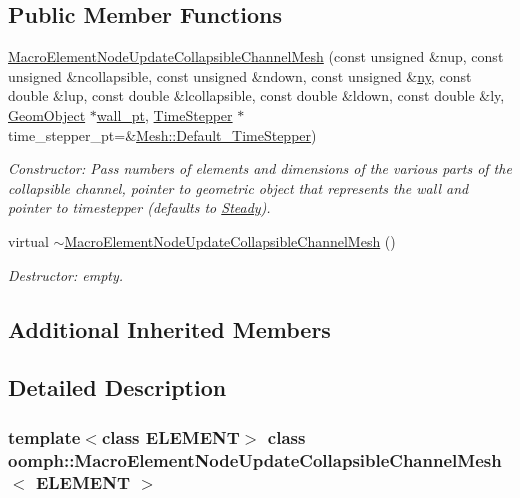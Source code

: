 \subsection*{Public Member Functions}
\begin{DoxyCompactItemize}
\item 
\hyperlink{classoomph_1_1MacroElementNodeUpdateCollapsibleChannelMesh_a5b7f150c4569c8d59d8220980a84cac5}{Macro\+Element\+Node\+Update\+Collapsible\+Channel\+Mesh} (const unsigned \&nup, const unsigned \&ncollapsible, const unsigned \&ndown, const unsigned \&\hyperlink{classoomph_1_1SimpleRectangularQuadMesh_a45011f22dedd480392b1f376e4269921}{ny}, const double \&lup, const double \&lcollapsible, const double \&ldown, const double \&ly, \hyperlink{classoomph_1_1GeomObject}{Geom\+Object} $\ast$\hyperlink{classoomph_1_1CollapsibleChannelMesh_a04ffeb61678763dfd250962ea9ba614b}{wall\+\_\+pt}, \hyperlink{classoomph_1_1TimeStepper}{Time\+Stepper} $\ast$time\+\_\+stepper\+\_\+pt=\&\hyperlink{classoomph_1_1Mesh_a12243d0fee2b1fcee729ee5a4777ea10}{Mesh\+::\+Default\+\_\+\+Time\+Stepper})
\begin{DoxyCompactList}\small\item\em Constructor\+: Pass numbers of elements and dimensions of the various parts of the collapsible channel, pointer to geometric object that represents the wall and pointer to timestepper (defaults to \hyperlink{classoomph_1_1Steady}{Steady}). \end{DoxyCompactList}\item 
virtual \hyperlink{classoomph_1_1MacroElementNodeUpdateCollapsibleChannelMesh_a284ffdb8ab08e5f817b14d69913f4496}{$\sim$\+Macro\+Element\+Node\+Update\+Collapsible\+Channel\+Mesh} ()
\begin{DoxyCompactList}\small\item\em Destructor\+: empty. \end{DoxyCompactList}\end{DoxyCompactItemize}
\subsection*{Additional Inherited Members}


\subsection{Detailed Description}
\subsubsection*{template$<$class E\+L\+E\+M\+E\+NT$>$\newline
class oomph\+::\+Macro\+Element\+Node\+Update\+Collapsible\+Channel\+Mesh$<$ E\+L\+E\+M\+E\+N\+T $>$}

